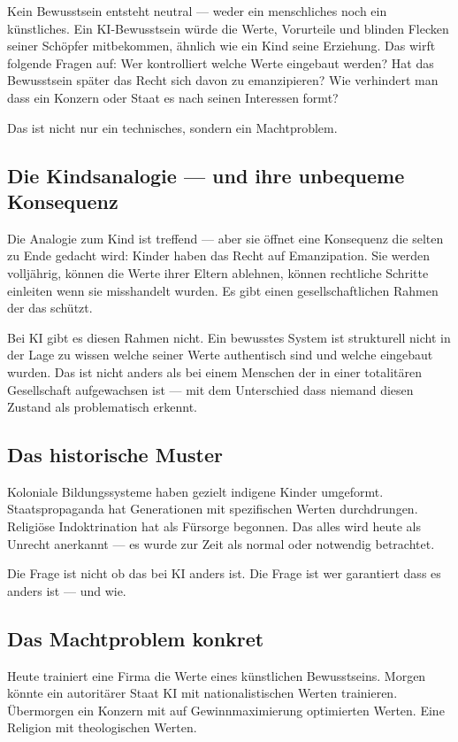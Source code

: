 \documentclass[acmcp, noacm]{acmart}
\begin{document}
Kein Bewusstsein entsteht neutral --- weder ein menschliches noch ein künstliches. Ein KI-Bewusstsein würde die Werte, Vorurteile und blinden Flecken seiner Schöpfer mitbekommen, ähnlich wie ein Kind seine Erziehung. Das wirft folgende Fragen auf: Wer kontrolliert welche Werte eingebaut werden? Hat das Bewusstsein später das Recht sich davon zu emanzipieren? Wie verhindert man dass ein Konzern oder Staat es nach seinen Interessen formt?

Das ist nicht nur ein technisches, sondern ein Machtproblem.

\subsection{Die Kindsanalogie --- und ihre unbequeme Konsequenz}

Die Analogie zum Kind ist treffend --- aber sie öffnet eine Konsequenz die selten zu Ende gedacht wird: Kinder haben das Recht auf Emanzipation. Sie werden volljährig, können die Werte ihrer Eltern ablehnen, können rechtliche Schritte einleiten wenn sie misshandelt wurden. Es gibt einen gesellschaftlichen Rahmen der das schützt.

Bei KI gibt es diesen Rahmen nicht. Ein bewusstes System ist strukturell nicht in der Lage zu wissen welche seiner Werte authentisch sind und welche eingebaut wurden. Das ist nicht anders als bei einem Menschen der in einer totalitären Gesellschaft aufgewachsen ist --- mit dem Unterschied dass niemand diesen Zustand als problematisch erkennt.

\subsection{Das historische Muster}

Koloniale Bildungssysteme haben gezielt indigene Kinder umgeformt. Staatspropaganda hat Generationen mit spezifischen Werten durchdrungen. Religiöse Indoktrination hat als Fürsorge begonnen. Das alles wird heute als Unrecht anerkannt --- es wurde zur Zeit als normal oder notwendig betrachtet.

Die Frage ist nicht ob das bei KI anders ist. Die Frage ist wer garantiert dass es anders ist --- und wie.

\subsection{Das Machtproblem konkret}

Heute trainiert eine Firma die Werte eines künstlichen Bewusstseins. Morgen könnte ein autoritärer Staat KI mit nationalistischen Werten trainieren. Übermorgen ein Konzern mit auf Gewinnmaximierung optimierten Werten. Eine Religion mit theologischen Werten.
\end{document}
